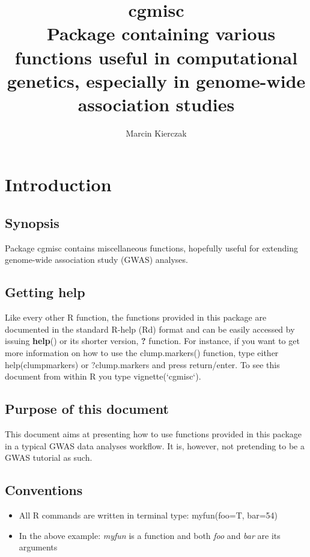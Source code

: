 \documentclass[12pt,a4paper,oneside]{article}\usepackage[]{graphicx}\usepackage[]{color}
\begin{document}
\title{\color{TealBlue} cgmisc \\\ \normalsize Package containing various functions useful in computational genetics, especially in genome-wide association studies}
\author{\color{Orange}Marcin Kierczak}
\maketitle

\newpage

\section*{Introduction}
\subsection{Synopsis}
\noindent Package cgmisc contains miscellaneous functions, hopefully useful for extending genome-wide association study (GWAS) analyses.
\subsection{Getting help}
\noindent Like every other R function, the functions provided in this package are documented in the standard R-help (Rd) format and can be easily accessed by issuing \textbf{help}() or its shorter version, \textbf{?} function. For instance, if you want to get more information on how to use the clump.markers() function, type either help(clumpmarkers) or ?clump.markers and press return/enter. To see this document from within R you type vignette(`cgmisc`).
\subsection{Purpose of this document}
\noindent This document aims at presenting how to use functions provided in this package in a typical GWAS data analyses workflow. It is, however, not pretending to be a GWAS tutorial as such.
\subsection{Conventions}
\begin{itemize}
\item{All R commands are written in terminal type: myfun(foo=T, bar=54)}
\item{In the above example: \textit{myfun} is a function and both \textit{foo} and \textit{bar} are its arguments}
\end{itemize}
\end{document}
